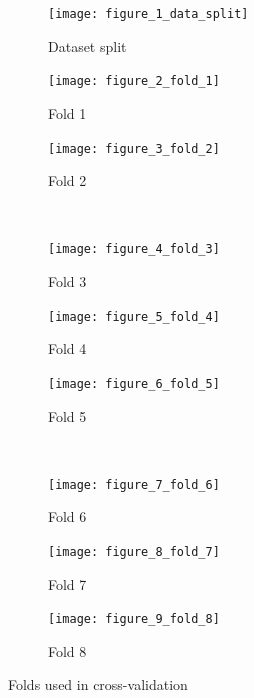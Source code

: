 \documentclass[a4paper]{article}
\begin{document}
\begin{figure}
    \centering
    \begin{subfigure}{0.32\textwidth}
        \centering
        \texttt{[image: figure\_1\_data\_split]}
        \caption{Dataset split}
        \label{fig:sub1}
    \end{subfigure}
    \hfill
    \begin{subfigure}{0.32\textwidth}
        \centering
        \texttt{[image: figure\_2\_fold\_1]}
        \caption{Fold 1}
        \label{fig:sub2}
    \end{subfigure}
    \hfill
    \begin{subfigure}{0.32\textwidth}
        \centering
        \texttt{[image: figure\_3\_fold\_2]}
        \caption{Fold 2}
        \label{fig:sub3}
    \end{subfigure}%
    \\
    \begin{subfigure}{0.32\textwidth}
        \centering
        \texttt{[image: figure\_4\_fold\_3]}
        \caption{Fold 3}
        \label{fig:sub4}
    \end{subfigure}\hfill
    \begin{subfigure}{0.32\textwidth}
        \centering
        \texttt{[image: figure\_5\_fold\_4]}
        \caption{Fold 4}
        \label{fig:sub5}
    \end{subfigure}\hfill
    \begin{subfigure}{0.32\textwidth}
        \centering
        \texttt{[image: figure\_6\_fold\_5]}
        \caption{Fold 5}
        \label{fig:sub6}
    \end{subfigure}
    \\
    \begin{subfigure}{0.32\textwidth}
        \centering
        \texttt{[image: figure\_7\_fold\_6]}
        \caption{Fold 6}
        \label{fig:sub7}
    \end{subfigure}\hfill
    \begin{subfigure}{0.32\textwidth}
        \centering
        \texttt{[image: figure\_8\_fold\_7]}
        \caption{Fold 7}
        \label{fig:sub8}
    \end{subfigure}\hfill
    \begin{subfigure}{0.32\textwidth}
        \centering
        \texttt{[image: figure\_9\_fold\_8]}
        \caption{Fold 8}
        \label{fig:sub9}
    \end{subfigure}
    \caption{Folds used in cross-validation}
    \label{fig:pre-ex1-kfold}
\end{figure}
\end{document}
